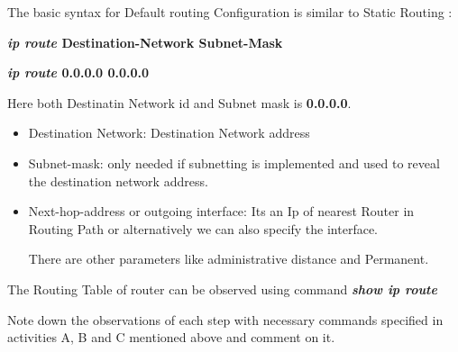 \documentclass[a4paper,11pt]{article}
\begin{document}
\begin{A}
    {

        The basic syntax for Default routing Configuration is similar to  Static Routing :
        \begin{center}
            \HRule

            {\bfseries \textit {ip route}  \quad Destination-Network \quad  Subnet-Mask   \\}

            {\bfseries \textit {ip route}  \quad \textbf{0.0.0.0} \quad  \textbf{0.0.0.0}   }

            \HRule
        \end{center}

        Here both Destinatin Network id and Subnet mask is \textbf{0.0.0.0}.

        \begin{itemize}
            \item Destination Network: Destination Network address
            \item Subnet-mask: only needed if subnetting is implemented and used to reveal the destination network address.
            \item Next-hop-address or outgoing interface: Its an Ip of nearest Router in Routing Path or alternatively we can also specify the interface.

                  There are other parameters like administrative distance and Permanent.
        \end{itemize}

        The Routing Table of router can be observed using command {\bfseries \textit{show ip route} }

    }
\end{A}

\pagebreak













\begin{Q}
    {
        Note down the observations of each step with necessary commands specified in activities
        A, B and C mentioned above and comment on it.
    }
\end{Q}
\end{document}
